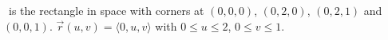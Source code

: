 {\surfaceS\ is the rectangle in space with corners at $(0,0,0)$, $(0,2,0)$, $(0,2,1)$ and $(0,0,1)$.
}
{$\vec r(u,v) = \langle 0, u, v\rangle$ with $0\leq u\leq 2$, $0\leq v\leq 1$.
}
